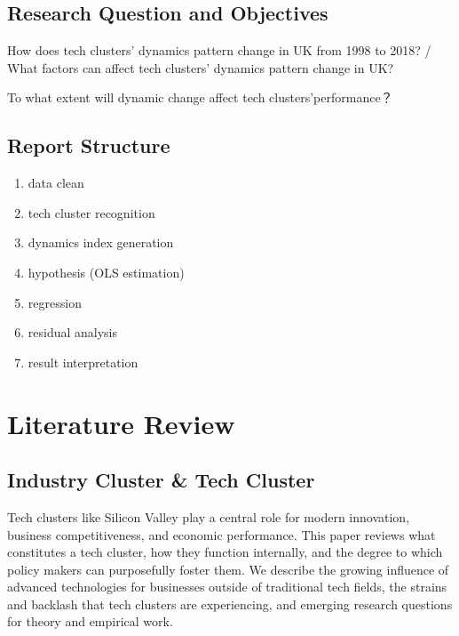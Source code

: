 \documentclass[
  12pt,
  oneside]{book}
\providecommand{\tightlist}{%
  \setlength{\itemsep}{0pt}\setlength{\parskip}{0pt}}
\begin{document}
\hypertarget{research-question-and-objectives}{%
\section{Research Question and Objectives}\label{research-question-and-objectives}}

How does tech clusters' dynamics pattern change in UK from 1998 to 2018? / What factors can affect tech clusters' dynamics pattern change in UK?

To what extent will dynamic change affect tech clusters'performance？

\hypertarget{report-structure}{%
\section{Report Structure}\label{report-structure}}

\begin{enumerate}
\def\labelenumi{\arabic{enumi}.}
\tightlist
\item
  data clean
\item
  tech cluster recognition
\item
  dynamics index generation
\item
  hypothesis (OLS estimation)
\item
  regression
\item
  residual analysis
\item
  result interpretation
\end{enumerate}

\hypertarget{crossref}{%
\chapter{Literature Review}\label{crossref}}

\hypertarget{industry-cluster-tech-cluster}{%
\section{Industry Cluster \& Tech Cluster}\label{industry-cluster-tech-cluster}}

Tech clusters like Silicon Valley play a central role for modern innovation, business competitiveness, and economic performance. This paper reviews what constitutes a tech cluster, how they function internally, and the degree to which policy makers can purposefully foster them. We describe the growing influence of advanced technologies for businesses outside of traditional tech fields, the strains and backlash that tech clusters are experiencing, and emerging research questions for theory and empirical work.
\end{document}
